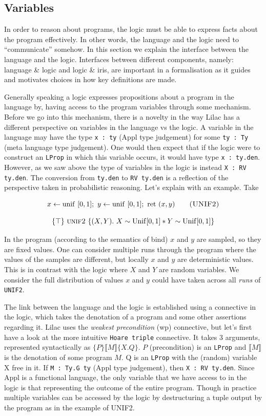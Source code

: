 \subsection{Variables}
\label{sec:variables}
In order to reason about programs, the logic must be able to express facts about the program effectively. In other words, the language and the logic need to 
``communicate'' somehow. In this section we explain the interface between the language and the logic. Interfaces between different components, namely:
language \& logic and logic \& iris, are important in a formalisation as it guides and motivates choices in how key definitions are made.

Generally speaking a logic expresses propositions about a program in the language by, having access to the program variables through some mechanism. Before we go
into this mechanism, there is a novelty in the way Lilac has a different perspective on variables in the language vs the logic. A variable in the language may have
the type \texttt{x : ty} (Appl type judgement) for some \texttt{ty : Ty} (meta language type judgement). One would then expect that if the logic were to construct an
\texttt{LProp} in which this variable occurs, it would have type \texttt{x : ty.den}. However, as we saw above the type of variables in the logic is instead \texttt{X : RV ty.den}.
The conversion from \texttt{ty.den} to \texttt{RV ty.den} is a reflection of the perspective taken in probabilistic reasoning. Let's
explain with an example. Take

\[
x \leftarrow \mathrm{unif}\ [0,1];\ y \leftarrow \mathrm{unif}\ [0,1];\ \mathrm{ret}\ (x,y)
\qquad \textsc{(UNIF2)}
\]

\[
\{ \top \}\ \textsc{unif2}\ \{ (X,Y).\ X \sim \mathrm{Unif}[0,1] \ast Y \sim \mathrm{Unif}[0,1] \}
\]

In the program (according to the semantics of bind) $x$ and $y$ are sampled, so they are fixed values. One can consider multiple runs through the program where
the values of the samples are different, but locally $x$ and $y$ are deterministic values. This is in contrast with the logic where $X$ and $Y$ are random variables.
We consider the full distribution of values $x$ and $y$ could have taken across all \emph{runs} of \texttt{UNIF2}.

The link between the language and the logic is established using a connective in the logic, which takes the denotation of a program and some
other assertions regarding it. Lilac uses the \emph{weakest precondition} (wp) connective, but let's first have a look at the more intuitive \texttt{Hoare triple}
connective. It takes 3 arguments, represented syntactically as $\{ P \} \llbracket M \rrbracket \{X. Q \}$.
$P$ (precondition) is an \texttt{LProp} and $\llbracket M \rrbracket$ is the denotation of some program $M$. Q is an \texttt{LProp}
with the (random) variable X free in it. If \texttt{M : Ty.G ty} (Appl type judgement), then \texttt{X : RV ty.den}. Since Appl is a functional language, the only variable that
we have access to in the logic is that representing the outcome of the entire program. Though in practice multiple variables can be accessed
by the logic by destructuring a tuple output by the program as in the example of UNIF2.

